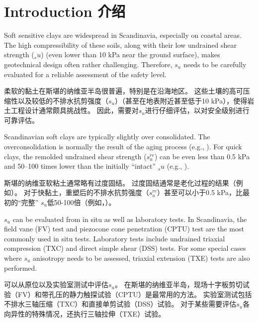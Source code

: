 \section{Introduction 介绍}

\begin{paracol}{2}

    Soft sensitive clays are widespread in Scandinavia, especially on coastal areas. The high compressibility of these soils, along with their low undrained shear strength ($_su$) (even lower than 10 kPa near the ground surface), makes geotechnical design often rather challenging. Therefore, $s_u$ needs to be carefully evaluated for a reliable assessment of the safety level.

    \switchcolumn

    柔软的黏土在斯堪的纳维亚半岛很普遍，特别是在沿海地区。 这些土壤的高可压缩性以及较低的不排水抗剪强度（$s_u$）（甚至在地表附近甚至低于10 kPa），使得岩土工程设计通常颇具挑战性。 因此，需要对$s_u$进行仔细评估，以对安全级别进行可靠评估。

    \switchcolumn*

    Scandinavian soft clays are typically slightly over consolidated. The overconsolidation is normally the result of the aging process (e.g., \citealt{Bjerrum19721}). For quick clays, the remolded undrained shear strength ($s_u^{re}$) can be even less than 0.5 kPa and 50–100 times lower than the initially “intact” $_su$ (e.g., \citealt{Rankka2004,Karlsrud20131273}).

    \switchcolumn

    斯堪的纳维亚软粘土通常略有过度固结。 过度固结通常是老化过程的结果（例如\citealt{Bjerrum19721}）。 对于快黏土，重塑后的不排水抗剪强度（$s_u^{re}$）甚至可以小于0.5 kPa，比最初的“完整” $s_u$低50-100倍（例如，\citealt{Rankka2004,Karlsrud20131273}）。

    \switchcolumn*

    $s_u$ can be evaluated from in situ as well as laboratory tests. In Scandinavia, the ﬁeld vane (FV) test and piezocone cone penetration (CPTU) test are the most commonly used in situ tests. Laboratory tests include undrained triaxial compression (TXC) and direct simple shear (DSS) tests. For some special cases where $s_u$ anisotropy needs to be assessed, triaxial extension (TXE) tests are also performed.

    \switchcolumn

    可以从原位以及实验室测试中评估$s_u$。 在斯堪的纳维亚半岛，现场十字板剪切试验（FV）和带孔压的静力触探试验（CPTU）是最常用的方法。 实验室测试包括不排水三轴压缩（TXC）和直接单剪试验（DSS）试验。 对于某些需要评估$s_u$各向异性的特殊情况，还执行三轴拉伸（TXE）试验。


\end{paracol}
